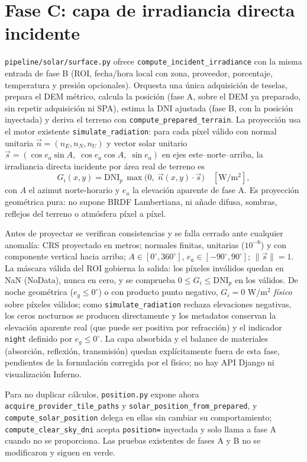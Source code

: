 \documentclass[11pt,a4paper]{article}
\begin{document}
\section{Fase C: capa de irradiancia directa incidente}
\texttt{pipeline/solar/surface.py} ofrece \texttt{compute\_incident\_irradiance} con la misma entrada de fase B (ROI, fecha/hora local con zona, proveedor, porcentaje, temperatura y presión opcionales). Orquesta una única adquisición de teselas, prepara el DEM métrico, calcula la posición (fase A, sobre el DEM ya preparado, sin repetir adquisición ni SPA), estima la DNI ajustada (fase B, con la posición inyectada) y deriva el terreno con \texttt{compute\_prepared\_terrain}. La proyección usa el motor existente \texttt{simulate\_radiation}: para cada píxel válido con normal unitaria $\vec n=(n_E,n_N,n_U)$ y vector solar unitario $\vec s=(\cos e_a\sin A,\;\cos e_a\cos A,\;\sin e_a)$ en ejes este--norte--arriba, la irradiancia directa incidente por área real de terreno es
\begin{equation}
 G_i(x,y)=\mathrm{DNI}_{p}\,\max\!\bigl(0,\;\vec n(x,y)\cdot\vec s\bigr)\quad[\mathrm{W/m^2}],
\end{equation}
con $A$ el azimut norte-horario y $e_a$ la elevación aparente de fase A. Es proyección geométrica pura: no supone BRDF Lambertiana, ni añade difusa, sombras, reflejos del terreno o atmósfera píxel a píxel.

Antes de proyectar se verifican consistencias y se falla cerrado ante cualquier anomalía: CRS proyectado en metros; normales finitas, unitarias ($10^{-6}$) y con componente vertical hacia arriba; $A\in[0^\circ,360^\circ]$, $e_a\in[-90^\circ,90^\circ]$; $\|\vec s\|=1$. La máscara válida del ROI gobierna la salida: los píxeles inválidos quedan en NaN (NoData), nunca en cero, y se comprueba $0\leq G_i\leq\mathrm{DNI}_{p}$ en los válidos. De noche geométrica ($e_g\leq0^\circ$) o con producto punto negativo, $G_i=0$ W/m$^2$ \emph{físico} sobre píxeles válidos; como \texttt{simulate\_radiation} rechaza elevaciones negativas, los ceros nocturnos se producen directamente y los metadatos conservan la elevación aparente real (que puede ser positiva por refracción) y el indicador \texttt{night} definido por $e_g\leq0^\circ$. La capa absorbida y el balance de materiales (absorción, reflexión, transmisión) quedan explícitamente fuera de esta fase, pendientes de la formulación corregida por el físico; no hay API Django ni visualización Inferno.

Para no duplicar cálculos, \texttt{position.py} expone ahora \texttt{acquire\_provider\_tile\_paths} y \texttt{solar\_position\_from\_prepared}, y \texttt{compute\_solar\_position} delega en ellas sin cambiar su comportamiento; \texttt{compute\_clear\_sky\_dni} acepta \texttt{position=} inyectada y solo llama a fase A cuando no se proporciona. Las pruebas existentes de fases A y B no se modificaron y siguen en verde.
\end{document}
